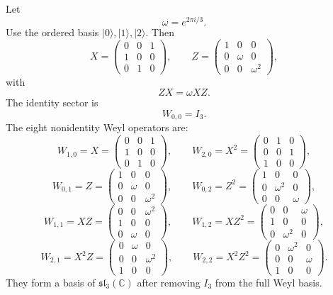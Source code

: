 \documentclass[11pt]{article}
\theoremstyle{remark}
\newcommand{\CC}{\mathbb C}
\begin{document}
Let
\[
        \omega=e^{2\pi i/3}.
\]
Use the ordered basis $|0\rangle,|1\rangle,|2\rangle$.  Then
\[
X=\begin{pmatrix}
0&0&1\\
1&0&0\\
0&1&0
\end{pmatrix},
\qquad
Z=\begin{pmatrix}
1&0&0\\
0&\omega&0\\
0&0&\omega^2
\end{pmatrix},
\]
with
\[
        ZX=\omega XZ.
\]
The identity sector is
\[
        W_{0,0}=I_3.
\]
The eight nonidentity Weyl operators are:
\[
W_{1,0}=X=\begin{pmatrix}0&0&1\\1&0&0\\0&1&0\end{pmatrix},
\qquad
W_{2,0}=X^2=\begin{pmatrix}0&1&0\\0&0&1\\1&0&0\end{pmatrix},
\]
\[
W_{0,1}=Z=\begin{pmatrix}1&0&0\\0&\omega&0\\0&0&\omega^2\end{pmatrix},
\qquad
W_{0,2}=Z^2=\begin{pmatrix}1&0&0\\0&\omega^2&0\\0&0&\omega\end{pmatrix},
\]
\[
W_{1,1}=XZ=\begin{pmatrix}0&0&\omega^2\\1&0&0\\0&\omega&0\end{pmatrix},
\qquad
W_{1,2}=XZ^2=\begin{pmatrix}0&0&\omega\\1&0&0\\0&\omega^2&0\end{pmatrix},
\]
\[
W_{2,1}=X^2Z=\begin{pmatrix}0&\omega&0\\0&0&\omega^2\\1&0&0\end{pmatrix},
\qquad
W_{2,2}=X^2Z^2=\begin{pmatrix}0&\omega^2&0\\0&0&\omega\\1&0&0\end{pmatrix}.
\]
They form a basis of $\mathfrak{sl}_3(\CC)$ after removing $I_3$ from the full Weyl basis.
\end{document}
